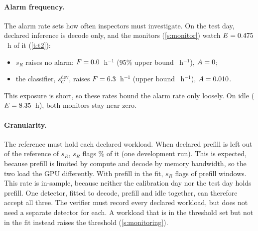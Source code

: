 \paragraph{Alarm frequency.} The alarm rate sets how often inspectors must investigate.
On the test day, declared inference is decode only, and the
monitors (\cref{s:monitor}) watch $E = 0.475$~h of it (\cref{t:t2}):
\begin{itemize}
  \item $s_R$ raises no alarm: $F = 0.0$~h$^{-1}$ (95\% upper bound
        \FupRoneDecode~h$^{-1}$), $A = 0$;
  \item the classifier, $s_C^{\mathrm{dev}}$, raises $F = 6.3$~h$^{-1}$ (upper bound
        \FupClfDecode~h$^{-1}$), $A = 0.010$.
\end{itemize}
This exposure is short, so these rates bound the alarm rate only loosely. On idle
($E = 8.35$~h), both monitors stay near zero.

\begin{table}[tp]
  \centering
  \footnotesize
  
  \caption{False alarms on the test day, per background, with exposure $E$.
    ``upper'': the 95\% upper bound on $F$, which assumes Poisson onsets. Overlapping
    windows make onsets correlated, so this bound is approximate. The intervals on $A$
    come from a block bootstrap (\cref{a:impl}). The test day holds no declared prefill. Non-AI work is undeclared, so $s_R$ is correct to alarm
    on it.}
  \label{t:t2}
\end{table}

\paragraph{Granularity.} The reference must hold each declared workload. When declared prefill
is left out of the reference of $s_R$, $s_R$ flags \RonePrefillHoldout\% of it (one
development run). This is expected, because prefill is limited by compute and decode
by memory bandwidth, so the two load the GPU differently. With prefill
in the fit, $s_R$ flags \PrefillInFitFlagged{} of \PrefillInFitN{} prefill windows.
This rate is in-sample, because neither the calibration day nor the test day holds
prefill. One detector, fitted to decode, prefill and idle together, can therefore
accept all three. The verifier must record every declared workload, but does not
need a separate detector for each. A workload that is in the
threshold set but not in the fit instead raises the threshold (\cref{s:monitoring}).

